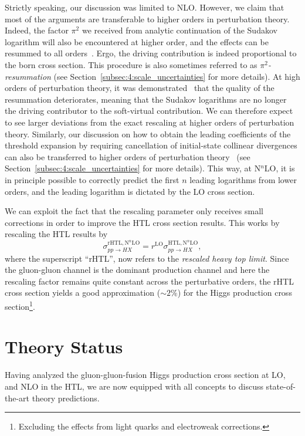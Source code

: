 Strictly speaking, our discussion was limited to \acs{NLO}. However, we claim that most of the arguments are transferable to higher orders in perturbation theory. Indeed, the factor $\pi^2$ we received from analytic continuation of the Sudakov logarithm will also be encountered at higher order, and the effects can be resummed to all orders~\cite{Ahrens:2008qu}. Ergo, the driving contribution is indeed proportional to the born cross section. This procedure is also sometimes referred to as $\pi^2$\textit{-resummation} (see Section~\ref{subsec:4:scale_uncertainties} for more details). At high orders of perturbation theory, it was demonstrated~\cite{Anastasiou:2016cez} that the quality of the resummation deteriorates, meaning that the Sudakov logarithms are no longer the driving contributor to the soft-virtual contribution. We can therefore expect to see larger deviations from the exact rescaling at higher orders of perturbation theory. Similarly, our discussion on how to obtain the leading coefficients of the threshold expansion by requiring cancellation of initial-state collinear divergences can also be transferred to higher orders of perturbation theory~\cite{Anastasiou:2014lda} (see Section~\ref{subsec:4:scale_uncertainties} for more details). This way, at N${}^n$LO, it is in principle possible to correctly predict the first $n$ leading logarithms from lower orders, and the leading logarithm is dictated by the \acs{LO} cross section.

We can exploit the fact that the rescaling parameter only receives small corrections in order to improve the \acs{HTL} cross section results. This works by rescaling the \acs{HTL} results by
\begin{equation}
\sigma_{pp \rightarrow HX}^{\mathrm{rHTL}, \mathrm{N}^n\mathrm{LO}} = r^{\mathrm{LO}} \sigma_{pp \rightarrow HX}^{\mathrm{HTL}, \mathrm{N}^n\mathrm{LO}},
\end{equation}
where the superscript ``\acs{rHTL}'', now refers to the \textit{rescaled heavy top limit}. Since the gluon-gluon channel is the dominant production channel and here the rescaling factor remains quite constant across the perturbative orders, the \acs{rHTL} cross section yields a good approximation ($\sim 2 \%$) for the Higgs production cross section\footnote{Excluding the effects from light quarks and electroweak corrections.}.




\section{Theory Status} \label{sec:4:theory_status}
Having analyzed the gluon-gluon-fusion Higgs production cross section at \acs{LO}, and \acs{NLO} in the \acs{HTL}, we are now equipped with all concepts to discuss state-of-the-art theory predictions.

